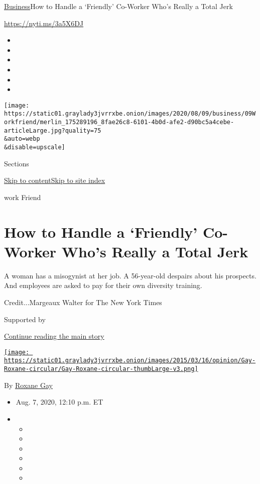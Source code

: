 \href{/section/business}{Business}\textbar{}How to Handle a `Friendly'
Co-Worker Who's Really a Total Jerk

\href{https://nyti.ms/3a5X6DJ}{https://nyti.ms/3a5X6DJ}

\begin{itemize}
\item
\item
\item
\item
\item
\item
\end{itemize}

\texttt{[image: https://static01.graylady3jvrrxbe.onion/images/2020/08/09/business/09Workfriend/merlin\_175289196\_8fae26c8-6101-4b0d-afe2-d90bc5a4cebe-articleLarge.jpg?quality=75\\\&auto=webp\\\&disable=upscale]}

Sections

\protect\hyperlink{site-content}{Skip to
content}\protect\hyperlink{site-index}{Skip to site index}

work Friend

\hypertarget{how-to-handle-a-friendly-co-worker-whos-really-a-total-jerk}{%
\section{How to Handle a `Friendly' Co-Worker Who's Really a Total
Jerk}\label{how-to-handle-a-friendly-co-worker-whos-really-a-total-jerk}}

A woman has a misogynist at her job. A 56-year-old despairs about his
prospects. And employees are asked to pay for their own diversity
training.

Credit...Margeaux Walter for The New York Times

Supported by

\protect\hyperlink{after-sponsor}{Continue reading the main story}

\href{https://www.nytimes3xbfgragh.onion/column/roxane-gay}{\texttt{[image: https://static01.graylady3jvrrxbe.onion/images/2015/03/16/opinion/Gay-Roxane-circular/Gay-Roxane-circular-thumbLarge-v3.png]}}

By \href{https://www.nytimes3xbfgragh.onion/column/roxane-gay}{Roxane
Gay}

\begin{itemize}
\item
  Aug. 7, 2020, 12:10 p.m. ET
\item
  \begin{itemize}
  \item
  \item
  \item
  \item
  \item
  \item
  \end{itemize}
\end{itemize}

